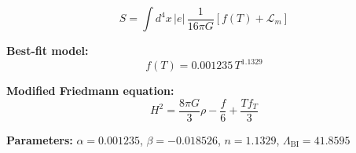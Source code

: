 
\begin{equation}
  S = \int d^4x \, |e| \, \frac{1}{16\pi G} \left[ f(T) + \mathcal{L}_m \right]
\end{equation}

\textbf{Best-fit model:}
\begin{equation}
  f(T) = 0.001235 \, T^{1.1329}
\end{equation}

\textbf{Modified Friedmann equation:}
\begin{equation}
  H^2 = \frac{8\pi G}{3} \rho - \frac{f}{6} + \frac{T f_T}{3}
\end{equation}

\textbf{Parameters:}
$\alpha = 0.001235$, \quad
$\beta = -0.018526$, \quad
$n = 1.1329$, \quad
$\Lambda_{\text{BI}} = 41.8595$